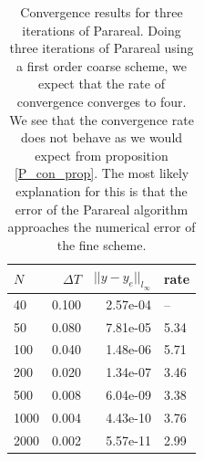 \begin{table}[h]
\centering
\caption{Convergence results for three iterations of Parareal. Doing three iterations of Parareal using a first order coarse scheme, we expect that the rate of convergence converges to four. We see that the convergence rate does not behave as we would expect from proposition \ref{P_con_prop}. The most likely explanation for this is that the error of the Parareal algorithm approaches the numerical error of the fine scheme. }
\label{par_con4}
\begin{tabular}{lrrl}
\toprule
{}$N$ &      $\Delta T$ &      $||y-y_e||_{l_{\infty}}$  &     rate \\
\midrule
40   &  0.100 &  2.57e-04 &       -- \\
50   &  0.080 &  7.81e-05 &  5.34 \\
100  &  0.040 &  1.48e-06 &  5.71 \\
200  &  0.020 &  1.34e-07 &  3.46 \\
500  &  0.008 &  6.04e-09 &  3.38 \\
1000 &  0.004 &  4.43e-10 &  3.76 \\
2000 &  0.002 &  5.57e-11 &   2.99 \\
\bottomrule
\end{tabular}
\end{table}
